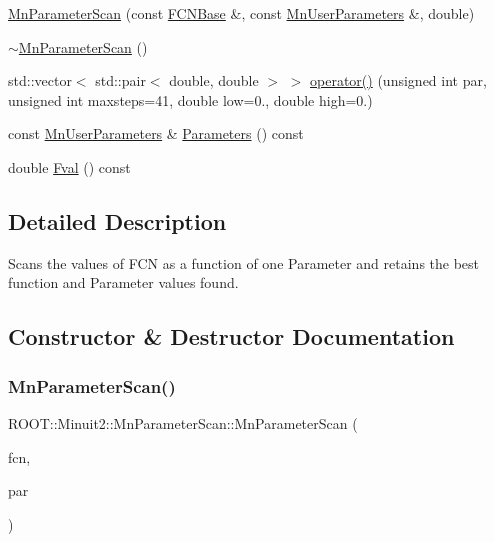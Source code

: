 \begin{DoxyCompactItemize}
\item 
\mbox{\hyperlink{classROOT_1_1Minuit2_1_1MnParameterScan_a741d7ce09e8fb56ab0f1345e8c8520c8}{Mn\+Parameter\+Scan}} (const \mbox{\hyperlink{classROOT_1_1Minuit2_1_1FCNBase}{F\+C\+N\+Base}} \&, const \mbox{\hyperlink{classROOT_1_1Minuit2_1_1MnUserParameters}{Mn\+User\+Parameters}} \&, double)
\item 
\mbox{\hyperlink{classROOT_1_1Minuit2_1_1MnParameterScan_af9a8ee2b797033783fe832ebe727ddc2}{$\sim$\+Mn\+Parameter\+Scan}} ()
\item 
std\+::vector$<$ std\+::pair$<$ double, double $>$ $>$ \mbox{\hyperlink{classROOT_1_1Minuit2_1_1MnParameterScan_aea28c9f299305c9ee1a0f5ad4b44a4e3}{operator()}} (unsigned int par, unsigned int maxsteps=41, double low=0., double high=0.)
\item 
const \mbox{\hyperlink{classROOT_1_1Minuit2_1_1MnUserParameters}{Mn\+User\+Parameters}} \& \mbox{\hyperlink{classROOT_1_1Minuit2_1_1MnParameterScan_aacca13f3ec5fe5acd706dee93edb56d4}{Parameters}} () const
\item 
double \mbox{\hyperlink{classROOT_1_1Minuit2_1_1MnParameterScan_a7251577562ac12179ea9669e9a10bac7}{Fval}} () const
\end{DoxyCompactItemize}


\subsection{Detailed Description}
Scans the values of F\+CN as a function of one Parameter and retains the best function and Parameter values found. 

\subsection{Constructor \& Destructor Documentation}
\mbox{\label{classROOT_1_1Minuit2_1_1MnParameterScan_a74db5691c231aae4eb0291501a046ae4}} 
\subsubsection{\texorpdfstring{MnParameterScan()}{MnParameterScan()}\hspace{0.1cm}{\footnotesize\ttfamily [1/4]}}
{\footnotesize\ttfamily R\+O\+O\+T\+::\+Minuit2\+::\+Mn\+Parameter\+Scan\+::\+Mn\+Parameter\+Scan (\begin{DoxyParamCaption}\item[{const \mbox{\hyperlink{classROOT_1_1Minuit2_1_1FCNBase}{F\+C\+N\+Base}} \&}]{fcn,  }\item[{const \mbox{\hyperlink{classROOT_1_1Minuit2_1_1MnUserParameters}{Mn\+User\+Parameters}} \&}]{par }\end{DoxyParamCaption})}

